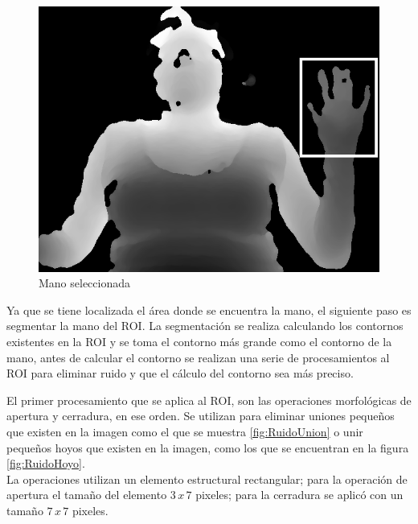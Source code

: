 \begin{figure}[!h]
\begin{center}
\includegraphics[scale=.5]{./Figures/roi.png}
\end{center}
\caption{Mano seleccionada}
\label{fig:Roi}
\end{figure}  

Ya que se tiene localizada el área donde se encuentra la mano, el siguiente paso es segmentar la mano del ROI. La segmentación se realiza calculando los contornos existentes en la ROI y se toma el contorno más grande como el contorno de la mano, antes de calcular el contorno se realizan una serie de procesamientos al ROI para eliminar ruido y que el cálculo del contorno sea más preciso.    

El primer procesamiento que se aplica al ROI, son las operaciones morfológicas de apertura y cerradura, en ese orden. Se utilizan para eliminar uniones pequeños que existen en la imagen como el que se muestra \ref{fig:RuidoUnion} o unir pequeños hoyos que existen en la imagen, como los que se encuentran en la figura \ref{fig:RuidoHoyo}.\\
La operaciones utilizan un elemento estructural rectangular; para la operación de apertura el tamaño del elemento $3 \, x \, 7$ pixeles; para la cerradura se aplic\'o con un tamaño  $7 \, x \, 7$ pixeles. 

